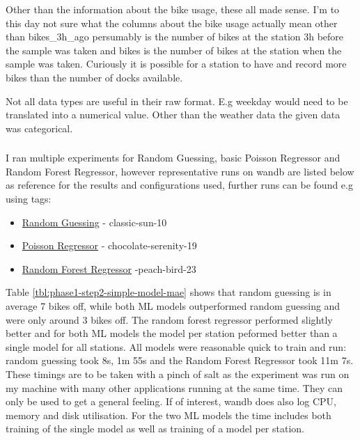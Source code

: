 \documentclass[a4paper]{article}
\begin{document}
    Other than the information about the bike usage, these all made sense. I'm to this day not sure what the columns
    about the bike usage actually mean other than bikes\_3h\_ago persumably is the number of bikes at the station 3h
    before the sample was taken and bikes is the number of bikes at the station when the sample was taken. Curiously it
    is possible for a station to have and record more bikes than the number of docks available.

    Not all data types are useful in their raw format. E.g weekday would need to be translated into a numerical value.
    Other than the weather data the given data was categorical.

    \subsubsection*{}

    I ran multiple experiments for Random Guessing, basic Poisson Regressor and Random Forest Regressor, however
    representative runs on wandb are listed below as reference for the results and configurations used, further runs can
    be found e.g using tags:
    \begin{itemize}
        \item \href{https://wandb.ai/idegen/mlp-2021/runs/3k64fgcw/overview?workspace=user-idegen}{Random Guessing} - classic-sun-10
        \item \href{https://wandb.ai/idegen/mlp-2021/runs/1iyx8zmh/overview?workspace=user-idegen}{Poisson Regressor} - chocolate-serenity-19
        \item \href{https://wandb.ai/idegen/mlp-2021/runs/25zvoihx/overview?workspace=user-idegen}{Random Forest Regressor} -peach-bird-23
    \end{itemize}

    Table \ref{tbl:phase1-step2-simple-model-mae} shows that random guessing is in average 7 bikes off, while both ML models
    outperformed random guessing and were only around 3 bikes off. The random forest regressor performed slightly better and
    for both ML models the model per station peformed better than a single model for all stations. All models
    were reasonable quick to train and run: random guessing took 8s, 1m 55s and the Random Forest Regressor took 11m 7s.
    These timings are to be taken with a pinch of salt as the experiment was run on my machine with many other applications
    running at the same time. They can only be used to get a general feeling. If of interest, wandb does
    also log CPU, memory and disk utilisation. For the two ML models the time includes both training of the single model
    as well as training of a model per station.
\end{document}
